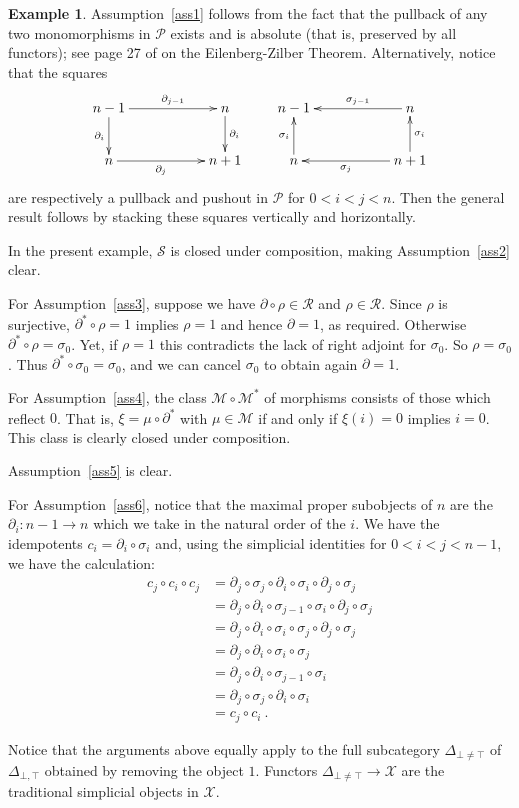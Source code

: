 \documentclass[a4paper,12pt,reqno]{amsart}
\theoremstyle{definition}
\newtheorem{example}[theorem]{Example}
\theoremstyle{fact}
\theoremstyle{genquest}
\theoremstyle{step}
\newcommand{\ra}{\rightarrow}
\def\CM{{\mathscr M}}
\def\CP{{\mathscr P}}
\def\CR{{\mathscr R}}
\def\CS{{\mathscr S}}
\def\CX{{\mathscr X}}
\begin{document}
\begin{example}
Assumption~\ref{ass1} follows from the fact that the pullback of any two 
monomorphisms in $\CP$ exists and is absolute (that is, preserved by all functors); 
see page 27 of \cite{GabZis} on the Eilenberg-Zilber Theorem. 
Alternatively, notice that the squares
$$
\xymatrix{
n-1 \ar[rr]^-{\partial_{j-1}} \ar[d]_-{\partial_{i}} && n \ar[d]^-{\partial_{i}} \\
n \ar[rr]_-{\partial_{j}}  && n+1 }
\qquad
\xymatrix{
n-1  && n \ar[ll]_-{\sigma_{j-1}} \\
n \ar[u]^-{\sigma_i}  && n+1 \ar[u]_-{\sigma_i} \ar[ll]^-{\sigma_j}}
$$
are respectively a pullback and pushout in $\CP$ for $0< i < j < n$.
Then the general result follows by stacking these squares vertically and horizontally.

In the present example, $\CS$ is closed under composition, making Assumption~\ref{ass2} clear.

For Assumption~\ref{ass3}, suppose we have $\partial \circ \rho \in \CR$ and $\rho \in \CR$. Since $\rho$ is surjective, $\partial^* \circ \rho = 1$ implies $\rho = 1$ 
and hence $\partial = 1$, as required. Otherwise $\partial^* \circ \rho = \sigma_0$.
Yet, if $\rho = 1$ this contradicts the lack of right adjoint for $\sigma_0$.
So $\rho = \sigma_0$. Thus $\partial^* \circ \sigma_0 = \sigma_0$, and we can
cancel $\sigma_0$ to obtain again $\partial = 1$. 

For Assumption~\ref{ass4}, the class $\CM\circ \CM^*$ of morphisms consists of
those which reflect $0$. That is, $\xi = \mu \circ \partial^*$ with
$\mu\in \CM$ if and only if $\xi(i)=0$ implies $i=0$. This class is
clearly closed under composition. 

Assumption~\ref{ass5} is clear. 

For Assumption~\ref{ass6}, notice that the maximal 
proper subobjects of $n$ are the $\partial_i : n-1 \ra n$ which we take in
the natural order of the $i$. We have the idempotents $c_i = \partial_i \circ \sigma_i$
and, using the simplicial identities for $0<i<j< n-1$, we have the calculation:
\begin{align*}
c_j\circ c_i\circ c_j & = \partial_j \circ \sigma_j\circ \partial_i \circ \sigma_i\circ \partial_j \circ \sigma_j \\ 
& = \partial_j \circ \partial_i\circ \sigma_{j-1} \circ \sigma_i\circ \partial_j \circ \sigma_j \\
& = \partial_j \circ \partial_i\circ \sigma_{i} \circ \sigma_j\circ \partial_j \circ \sigma_j \\
& = \partial_j \circ \partial_i\circ \sigma_{i} \circ \sigma_j  \\
& = \partial_j \circ \partial_i\circ \sigma_{j-1} \circ \sigma_i \\
& = \partial_j \circ \sigma_j\circ \partial_{i} \circ \sigma_i \\ 
& = c_j\circ c_i \ . 
\end{align*}

Notice that the arguments above equally apply to the full subcategory  
$\Delta_{\bot\neq\top}$ of $\Delta_{\bot,\top}$ obtained by removing the object $1$.
Functors $\Delta_{\bot\neq \top}\ra \CX$ are the traditional simplicial objects in $\CX$. 
\end{example}
\end{document}
